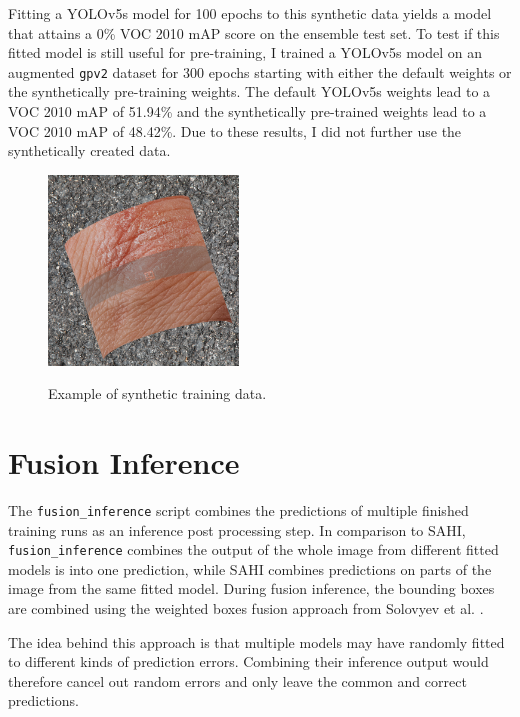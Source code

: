 \documentclass[10pt]{book}
\begin{document}
Fitting a \ac{YOLO}v5s model for 100 epochs to this synthetic data yields a model that attains a 0\% VOC 2010 \ac{mAP} score on the ensemble test set. To test if this fitted model is still useful for pre-training, I trained a \ac{YOLO}v5s model on an augmented \texttt{gpv2} dataset for 300 epochs starting with either the default weights or the synthetically pre-training weights. The default \ac{YOLO}v5s weights lead to a VOC 2010 \ac{mAP} of 51.94\% and the synthetically pre-trained weights lead to a VOC 2010 \ac{mAP} of 48.42\%. Due to these results, I did not further use the synthetically created data.

\begin{figure}
  \caption{Example of synthetic training data.}
  \includegraphics[width=0.45\textwidth]{image/synth_data_example}
  \label{fig:synth_data_example}
\end{figure}

\section{Fusion Inference}

The \texttt{fusion\_inference} script combines the predictions of multiple finished training runs as an inference post processing step. In comparison to \ac{SAHI}, \texttt{fusion\_inference} combines the output of the whole image from different fitted models is into one prediction, while \ac{SAHI} combines predictions on parts of the image from the same fitted model. During fusion inference, the bounding boxes are combined using the weighted boxes fusion approach from Solovyev et al. \cite{solovyev2021weighted}. 

The idea behind this approach is that multiple models may have randomly fitted to different kinds of prediction errors. Combining their inference output would therefore cancel out random errors and only leave the common and correct predictions.
\end{document}
